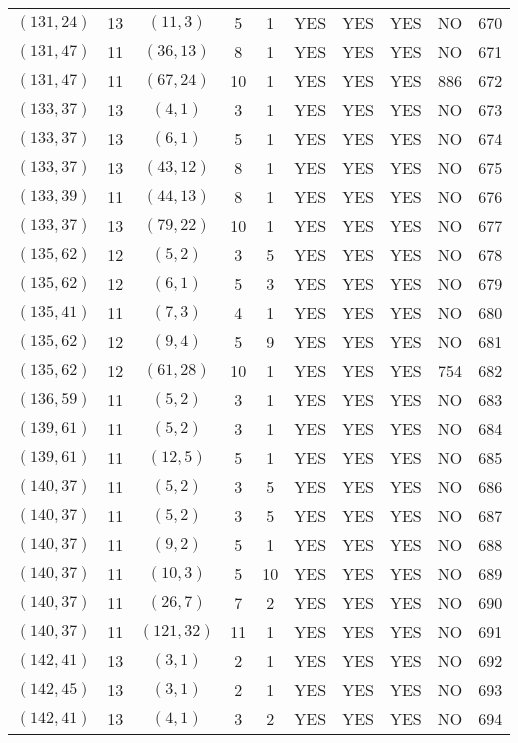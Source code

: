 \begin{longtable}{|c|c|c|c|c|c|c|c|c|c|}
$(131, 24)$ & 13 & $(11, 3)$ & 5 & 1 & YES & YES & YES & NO & 670\\
$(131, 47)$ & 11 & $(36, 13)$ & 8 & 1 & YES & YES & YES & NO & 671\\
$(131, 47)$ & 11 & $(67, 24)$ & 10 & 1 & YES & YES & YES & 886 & 672\\
$(133, 37)$ & 13 & $(4, 1)$ & 3 & 1 & YES & YES & YES & NO & 673\\
$(133, 37)$ & 13 & $(6, 1)$ & 5 & 1 & YES & YES & YES & NO & 674\\
$(133, 37)$ & 13 & $(43, 12)$ & 8 & 1 & YES & YES & YES & NO & 675\\
$(133, 39)$ & 11 & $(44, 13)$ & 8 & 1 & YES & YES & YES & NO & 676\\
$(133, 37)$ & 13 & $(79, 22)$ & 10 & 1 & YES & YES & YES & NO & 677\\
$(135, 62)$ & 12 & $(5, 2)$ & 3 & 5 & YES & YES & YES & NO & 678\\
$(135, 62)$ & 12 & $(6, 1)$ & 5 & 3 & YES & YES & YES & NO & 679\\
$(135, 41)$ & 11 & $(7, 3)$ & 4 & 1 & YES & YES & YES & NO & 680\\
$(135, 62)$ & 12 & $(9, 4)$ & 5 & 9 & YES & YES & YES & NO & 681\\
$(135, 62)$ & 12 & $(61, 28)$ & 10 & 1 & YES & YES & YES & 754 & 682\\
$(136, 59)$ & 11 & $(5, 2)$ & 3 & 1 & YES & YES & YES & NO & 683\\
$(139, 61)$ & 11 & $(5, 2)$ & 3 & 1 & YES & YES & YES & NO & 684\\
$(139, 61)$ & 11 & $(12, 5)$ & 5 & 1 & YES & YES & YES & NO & 685\\
$(140, 37)$ & 11 & $(5, 2)$ & 3 & 5 & YES & YES & YES & NO & 686\\
$(140, 37)$ & 11 & $(5, 2)$ & 3 & 5 & YES & YES & YES & NO & 687\\
$(140, 37)$ & 11 & $(9, 2)$ & 5 & 1 & YES & YES & YES & NO & 688\\
$(140, 37)$ & 11 & $(10, 3)$ & 5 & 10 & YES & YES & YES & NO & 689\\
$(140, 37)$ & 11 & $(26, 7)$ & 7 & 2 & YES & YES & YES & NO & 690\\
$(140, 37)$ & 11 & $(121, 32)$ & 11 & 1 & YES & YES & YES & NO & 691\\
$(142, 41)$ & 13 & $(3, 1)$ & 2 & 1 & YES & YES & YES & NO & 692\\
$(142, 45)$ & 13 & $(3, 1)$ & 2 & 1 & YES & YES & YES & NO & 693\\
$(142, 41)$ & 13 & $(4, 1)$ & 3 & 2 & YES & YES & YES & NO & 694\\

\end{longtable}
